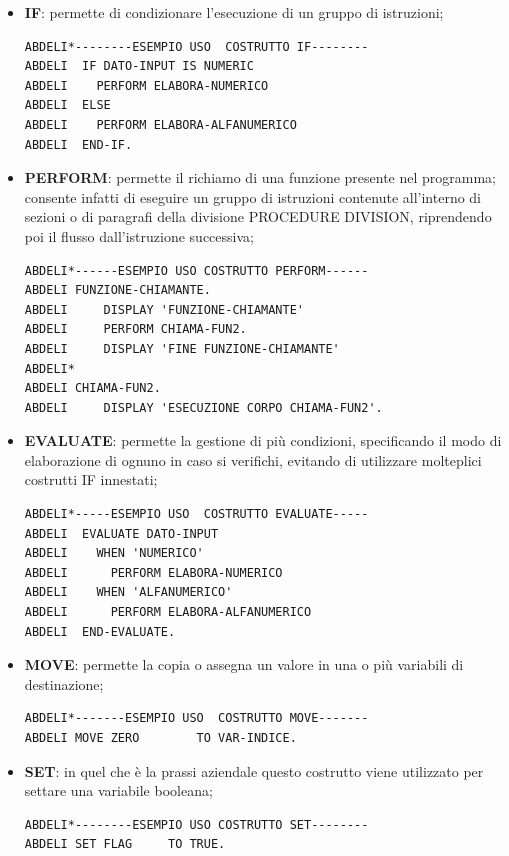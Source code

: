 \begin{itemize}
	\item \textbf{IF}: permette di condizionare l'esecuzione di un gruppo di istruzioni;
	\begin{lstlisting}[language=cobol]
ABDELI*--------ESEMPIO USO  COSTRUTTO IF--------
ABDELI 	IF DATO-INPUT IS NUMERIC
ABDELI 	  PERFORM ELABORA-NUMERICO
ABDELI	ELSE
ABDELI	  PERFORM ELABORA-ALFANUMERICO
ABDELI	END-IF.
	\end{lstlisting}
	
	\item \textbf{PERFORM}: permette il richiamo di una funzione presente nel programma; consente infatti di eseguire un gruppo di istruzioni contenute all’interno di sezioni o di paragrafi della divisione PROCEDURE DIVISION, riprendendo poi il flusso dall'istruzione successiva;
	\begin{lstlisting}[language=cobol]
ABDELI*------ESEMPIO USO COSTRUTTO PERFORM------
ABDELI FUNZIONE-CHIAMANTE.
ABDELI     DISPLAY 'FUNZIONE-CHIAMANTE'
ABDELI 	   PERFORM CHIAMA-FUN2.
ABDELI     DISPLAY 'FINE FUNZIONE-CHIAMANTE'
ABDELI*
ABDELI CHIAMA-FUN2.
ABDELI     DISPLAY 'ESECUZIONE CORPO CHIAMA-FUN2'.
	\end{lstlisting}

	\item \textbf{EVALUATE}: permette la gestione di più condizioni, specificando il modo di elaborazione di ognuno in caso si verifichi, evitando di utilizzare molteplici costrutti IF innestati;
	\begin{lstlisting}[language=cobol]
ABDELI*-----ESEMPIO USO  COSTRUTTO EVALUATE-----
ABDELI 	EVALUATE DATO-INPUT
ABDELI	  WHEN 'NUMERICO'
ABDELI 	    PERFORM ELABORA-NUMERICO
ABDELI	  WHEN 'ALFANUMERICO'
ABDELI	    PERFORM ELABORA-ALFANUMERICO
ABDELI	END-EVALUATE.
	\end{lstlisting}

	\item \textbf{MOVE}: permette la copia o assegna un valore in una o più variabili di destinazione;
	\begin{lstlisting}[language=cobol]
ABDELI*-------ESEMPIO USO  COSTRUTTO MOVE-------
ABDELI MOVE ZERO		TO VAR-INDICE.
	\end{lstlisting}

	\item \textbf{SET}: in quel che è la prassi aziendale questo costrutto viene utilizzato per settare una variabile booleana;
	\begin{lstlisting}[language=cobol]
ABDELI*--------ESEMPIO USO COSTRUTTO SET--------
ABDELI SET FLAG		TO TRUE.
	\end{lstlisting}


\end{itemize}
